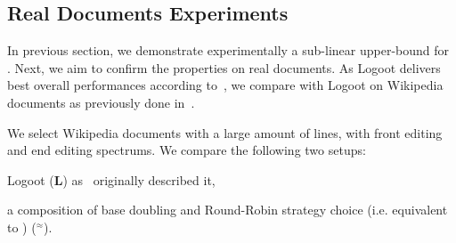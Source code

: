 

\subsection{Real Documents Experiments}

In previous section, we demonstrate experimentally a sub-linear upper-bound for
\NAME{}. Next, we aim to confirm the \NAME{} properties on real documents. As
Logoot delivers best overall performances according
to~\cite{ahmed2011evaluating}, we compare \NAME{} with Logoot on Wikipedia
documents as previously done in~\cite{DBLP:journals/tpds/WeissUM10}.

We select Wikipedia documents with a large amount of lines, with front editing
and end editing spectrums. We compare the following two setups:
\begin{inparaenum}[(1)]
  \item Logoot (\textbf{L}) as~\cite{weiss2009logoot} originally described it,
  \item a composition of base doubling and Round-Robin strategy choice
    (i.e. equivalent to \NAME{}) (\textbf{\NAME{}}$^\approx$).
\end{inparaenum}

